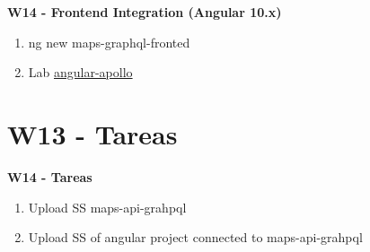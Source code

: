 \documentclass{beamer}
\begin{document}
\begin{frame}

    
\textbf{W14 - Frontend Integration (Angular 10.x)}


\begin{enumerate}

\item
  ng new maps-graphql-fronted

\item
   
 Lab \href{https://www.apollographql.com/docs/angular/basics/setup/}{angular-apollo}

 
\end{enumerate}

	


\end{frame}

\section{W13  - Tareas }

\begin{frame}


\textbf{W14  - Tareas}


\begin{enumerate}

\item
  Upload SS maps-api-grahpql 

\item
  Upload SS of angular project connected to maps-api-grahpql 
 	
\end{enumerate} 


\end{frame}
\end{document}
